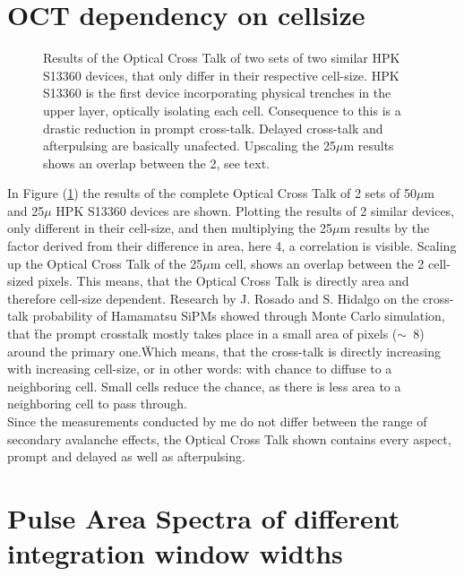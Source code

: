 \documentclass[12pt,article,type=msc,colorback,accentcolor=tud9c]{tudthesis}
\begin{document}
\section{OCT dependency on cellsize}
\label{appsec:OCT_Size}
\begin{figure}[h]
\begin{centering}
\caption[OCT dependency on the cell-size]{Results of the Optical Cross Talk of two sets of two similar HPK S13360 devices, that only differ in their respective cell-size. HPK S13360 is the first device incorporating physical trenches in the upper layer, optically isolating each cell. Consequence to this is a drastic reduction in prompt cross-talk. Delayed cross-talk and afterpulsing are basically unafected. Upscaling the 25$\mu$m results shows an overlap between the 2, see text.}
\label{fig:cell-size}
\end{centering}
\end{figure}
In Figure (\ref{fig:cell-size}) the results of the complete Optical Cross Talk of 2 sets of 50$\mu$m and 25$\mu$ HPK S13360 devices are shown. Plotting the results of 2 similar devices, only different in their cell-size, and then multiplying the 25$\mu$m results by the factor derived from their difference in area, here 4, a correlation is visible. Scaling up the Optical Cross Talk of the 25$\mu$m cell, shows an overlap between the 2 cell-sized pixels. This means, that the Optical Cross Talk is directly area and therefore cell-size dependent. Research by J. Rosado and S. Hidalgo \cite{ModelCTAP} on the cross-talk probability of Hamamatsu SiPMs showed through Monte Carlo simulation, that \"the prompt crosstalk mostly takes place in a small area of pixels ($\sim$~8) around the primary one.\" Which means, that the cross-talk is directly increasing with increasing cell-size, or in other words: with chance to diffuse to a neighboring cell. Small cells reduce the chance, as there is less area to a neighboring cell to pass through.\\
Since the measurements conducted by me do not differ between the range of secondary avalanche effects, the Optical Cross Talk shown contains every aspect, prompt and delayed as well as afterpulsing.

\clearpage
\section{Pulse Area Spectra of different integration window widths}
\label{appsec:PAS_window}
\end{document}
